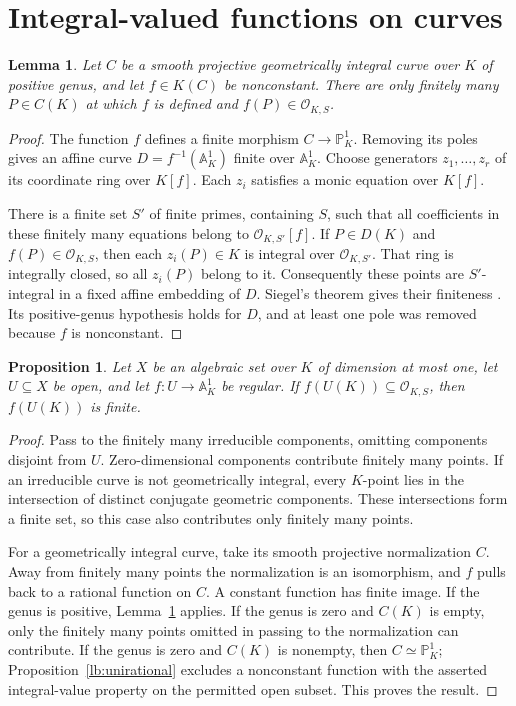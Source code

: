 \documentclass[11pt,a4paper]{article}
\newtheorem{proposition}[theorem]{Proposition}
\newtheorem{lemma}[theorem]{Lemma}
\theoremstyle{definition}
\newcommand{\OKS}{\mathcal O_{K,S}}
\newcommand{\A}{\mathbb A}
\newcommand{\PP}{\mathbb P}
\begin{document}
\section{Integral-valued functions on curves}

\begin{lemma}\label{lb:positive-genus}
Let $C$ be a smooth projective geometrically integral curve over
$K$ of positive genus, and let $f\in K(C)$ be nonconstant. There
are only finitely many $P\in C(K)$ at which $f$ is defined and
$f(P)\in\OKS$.
\end{lemma}
\begin{proof}
The function $f$ defines a finite morphism $C\to\PP^1_K$.
Removing its poles gives an affine curve
$D=f^{-1}(\A^1_K)$ finite over $\A^1_K$. Choose generators
$z_1,\ldots,z_r$ of its coordinate ring over $K[f]$. Each $z_i$
satisfies a monic equation over $K[f]$.

There is a finite set $S'$ of finite primes, containing $S$, such
that all coefficients in these finitely many equations belong to
$\mathcal O_{K,S'}[f]$. If $P\in D(K)$ and $f(P)\in\OKS$,
then each $z_i(P)\in K$ is integral over $\mathcal O_{K,S'}$.
That ring is integrally closed, so all $z_i(P)$ belong to it.
Consequently these points are $S'$-integral in a fixed affine
embedding of $D$. Siegel's theorem gives their finiteness
\cite[Chapter~8]{Lang}. Its positive-genus hypothesis holds for
$D$, and at least one pole was removed because $f$ is nonconstant.
\end{proof}

\begin{proposition}\label{lb:curves}
Let $X$ be an algebraic set over $K$ of dimension at most one,
let $U\subseteq X$ be open, and let $f:U\to\A^1_K$ be regular.
If $f(U(K))\subseteq\OKS$, then $f(U(K))$ is finite.
\end{proposition}
\begin{proof}
Pass to the finitely many irreducible components, omitting components
disjoint from $U$. Zero-dimensional components contribute finitely
many points. If an irreducible curve is not geometrically integral,
every $K$-point lies in the intersection of distinct conjugate
geometric components. These intersections form a finite set, so this
case also contributes only finitely many points.

For a geometrically integral curve, take its smooth projective
normalization $C$. Away from finitely many points the normalization
is an isomorphism, and $f$ pulls back to a rational function on $C$.
A constant function has finite image. If the genus is positive,
Lemma~\ref{lb:positive-genus} applies. If the genus is zero and
$C(K)$ is empty, only the finitely many points omitted in passing
to the normalization can contribute. If the genus is zero and
$C(K)$ is nonempty, then $C\simeq\PP^1_K$; Proposition~\ref{lb:unirational}
excludes a nonconstant function with the asserted integral-value
property on the permitted open subset. This proves the result.
\end{proof}
\end{document}
